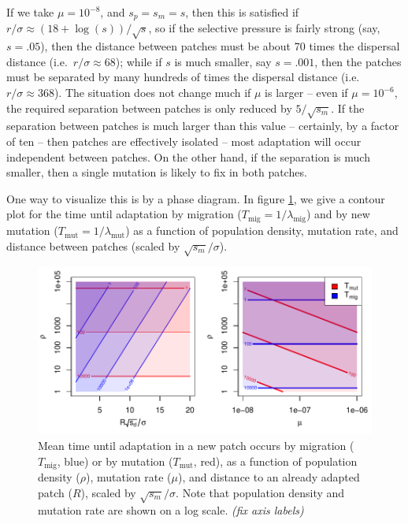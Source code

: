 \documentclass{article}
\newcommand{\migrate}{\lambda_\text{mig}}
\newcommand{\mutrate}{\lambda_\text{mut}}
\newcommand{\Tmig}{T_\text{mig}}
\newcommand{\Tmut}{T_\text{mut}}
\newcommand{\plr}[1]{{\it\color{blue}(#1)}}
\begin{document}
If we take $\mu = 10^{-8}$, and $s_p=s_m=s$, then this is satisfied if $r/\sigma \approx (18+\log(s))/\sqrt{s}$,
so if the selective pressure is fairly strong (say, $s=.05$),
then the distance between patches must be about 70 times the dispersal distance (i.e.\ $r/\sigma \approx 68$);
while if $s$ is much smaller, say $s = .001$, 
then the patches must be separated by many hundreds of times the dispersal distance (i.e.\ $r/\sigma \approx 368$).
The situation does not change much if $\mu$ is larger -- even if $\mu = 10^{-6}$, 
the required separation between patches is only reduced by $5/\sqrt{s_m}$.
If the separation between patches is much larger than this value -- certainly, by a factor of ten -- 
then patches are effectively isolated -- most adaptation will occur independent between patches.
On the other hand, if the separation is much smaller, then a single
mutation is likely to fix in both patches.

One way to visualize this is by a phase diagram.
In figure \ref{fig:phase_diagram},
we give a contour plot for the time until adaptation by migration ($\Tmig = 1/\migrate$) and by new mutation ($\Tmut=1/\mutrate$)
as a function of population density, mutation rate, and distance between patches (scaled by $\sqrt{s_m}/\sigma$).

\begin{figure}[ht]
  \begin{center}
    \includegraphics{phase-diagram-log}
  \end{center}
  \caption{
  Mean time until adaptation in a new patch occurs by migration ($\Tmig$, blue) or by mutation ($\Tmut$, red),
  as a function of population density ($\rho$), mutation rate ($\mu$), 
  and distance to an already adapted patch ($R$), scaled by $\sqrt{s_m}/\sigma$.
  Note that population density and mutation rate are shown on a log scale.
  \plr{fix axis labels}
  \label{fig:phase_diagram}
  }
\end{figure}
\end{document}
